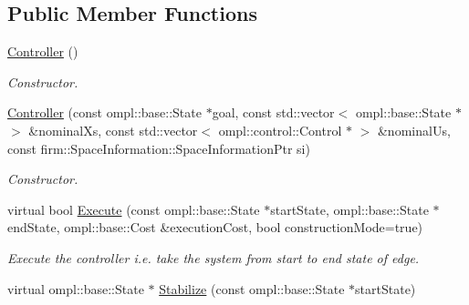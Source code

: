 \subsection*{\-Public \-Member \-Functions}
\begin{DoxyCompactItemize}
\item 
\hypertarget{class_controller_ab3f614e32fa25535809e056ce2492ab3}{\hyperlink{class_controller_ab3f614e32fa25535809e056ce2492ab3}{\-Controller} ()}\label{class_controller_ab3f614e32fa25535809e056ce2492ab3}

\begin{DoxyCompactList}\small\item\em \-Constructor. \end{DoxyCompactList}\item 
\hypertarget{class_controller_a50a65edd2cf9fcce0cca465cbc3d527d}{\hyperlink{class_controller_a50a65edd2cf9fcce0cca465cbc3d527d}{\-Controller} (const ompl\-::base\-::\-State $\ast$goal, const std\-::vector$<$ ompl\-::base\-::\-State $\ast$ $>$ \&nominal\-Xs, const std\-::vector$<$ ompl\-::control\-::\-Control $\ast$ $>$ \&nominal\-Us, const firm\-::\-Space\-Information\-::\-Space\-Information\-Ptr si)}\label{class_controller_a50a65edd2cf9fcce0cca465cbc3d527d}

\begin{DoxyCompactList}\small\item\em \-Constructor. \end{DoxyCompactList}\item 
\hypertarget{class_controller_a01cbbc1435d0a4ed8733332bef6d7342}{virtual bool \hyperlink{class_controller_a01cbbc1435d0a4ed8733332bef6d7342}{\-Execute} (const ompl\-::base\-::\-State $\ast$start\-State, ompl\-::base\-::\-State $\ast$end\-State, ompl\-::base\-::\-Cost \&execution\-Cost, bool construction\-Mode=true)}\label{class_controller_a01cbbc1435d0a4ed8733332bef6d7342}

\begin{DoxyCompactList}\small\item\em \-Execute the controller i.\-e. take the system from start to end state of edge. \end{DoxyCompactList}\item 
\hypertarget{class_controller_aba227cad46f73fab5fcf37b41cae71a9}{virtual ompl\-::base\-::\-State $\ast$ \hyperlink{class_controller_aba227cad46f73fab5fcf37b41cae71a9}{\-Stabilize} (const ompl\-::base\-::\-State $\ast$start\-State)}\label{class_controller_aba227cad46f73fab5fcf37b41cae71a9}


\end{DoxyCompactItemize}
